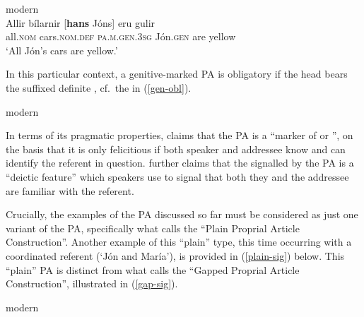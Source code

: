 \documentclass[output=paper,colorlinks,citecolor=brown]{langscibook}
\begin{document}
\ea \label{noun-gen} modern \\
\gll Allir bílarnir [\textbf{hans} Jóns] eru gulir \\
    all.\textsc{nom} cars.\textsc{nom.def} \textsc{pa.m.gen.3sg} Jón.\textsc{gen} are yellow\\
\glt `All Jón's cars are yellow.' \citep[213]{Sigurdsson2006}
\z

In this particular context, a genitive-marked PA is obligatory if the head  bears the suffixed definite   \citep{Sigurdsson2006}, cf.~the  in (\ref{gen-obl}).

\ea \label{gen-obl} modern 
\z 
\z

In terms of its pragmatic properties, \citet[220]{Sigurdsson2006} claims that the PA is a ``marker of  or '', on the basis that it is only felicitious if both speaker and addressee know and can identify the referent in question.  \citet[226]{Sigurdsson2006} further claims that the  signalled by the PA is a ``deictic feature'' which speakers use to signal that both they and the addressee are familiar with the referent.

Crucially, the examples of the  PA discussed so far must be considered as just one variant of the PA, specifically what \citet{Sigurdsson2006} calls the ``Plain Proprial Article Construction''. Another example of this ``plain'' type, this time occurring with a coordinated referent (`Jón and María'), is provided in (\ref{plain-sig}) below. This ``plain'' PA is distinct from what \citet{Sigurdsson2006} calls the ``Gapped Proprial Article Construction'', illustrated in (\ref{gap-sig}).

\ea modern 
\z 
\z
\end{document}
